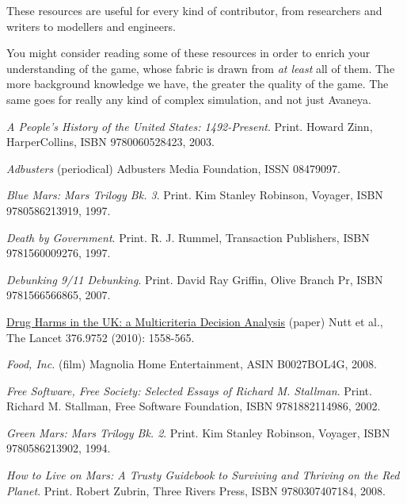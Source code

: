
These resources are useful for every kind of contributor, from researchers and writers to modellers and engineers.

You might consider reading some of these resources in order to enrich your understanding of the game, whose fabric is drawn from {\it at least} all of them. The more background knowledge we have, the greater the quality of the game. The same goes for really any kind of complex simulation, and not just Avaneya.

\startitemize[4]
\item
{\it A People's History of the United States: 1492-Present}. Print.\crlf
Howard Zinn, HarperCollins, ISBN 9780060528423, 2003.

\item
{\it Adbusters} (periodical)\crlf
Adbusters Media Foundation, ISSN 08479097.

\item
{\it Blue Mars: Mars Trilogy Bk. 3}. Print.\crlf
Kim Stanley Robinson, Voyager, ISBN 9780586213919, 1997.

\item
{\it Death by Government}. Print.\crlf
R. J. Rummel, Transaction Publishers, ISBN 9781560009276, 1997.

\item
{\it Debunking 9/11 Debunking}. Print.\crlf
David Ray Griffin, Olive Branch Pr, ISBN 9781566566865, 2007.

\item
\href{http://is.gd/QXTVmH}{Drug Harms in the UK: a Multicriteria Decision Analysis} (paper)\crlf
Nutt et al., The Lancet 376.9752 (2010): 1558-565.

\item
{\it Food, Inc.} (film)\crlf
Magnolia Home Entertainment, ASIN B0027BOL4G, 2008.

\item
{\it Free Software, Free Society: Selected Essays of Richard M. Stallman}. Print.\crlf
Richard M. Stallman, Free Software Foundation, ISBN 9781882114986, 2002.

\item
{\it Green Mars: Mars Trilogy Bk. 2}. Print.\crlf
Kim Stanley Robinson, Voyager, ISBN 9780586213902, 1994.

\item
{\it How to Live on Mars: A Trusty Guidebook to Surviving and Thriving on the Red Planet}. Print.\crlf
Robert Zubrin, Three Rivers Press, ISBN 9780307407184, 2008.

